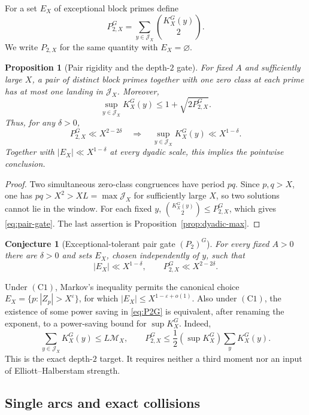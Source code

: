 \documentclass[11pt]{amsart}
\theoremstyle{plain}
\newtheorem{proposition}{Proposition}
\newtheorem{conjecture}{Conjecture}
\theoremstyle{remark}
\begin{document}
For a set $E_X$ of exceptional block primes define
\[
 P_{2,X}^{G}
 =\sum_{y\in\mathcal J_X}\binom{K_X^{G}(y)}2.
 \tag{6.3}\label{eq:P2-definition}
\]
We write $P_{2,X}$ for the same quantity with $E_X=\varnothing$.

\begin{proposition}[Pair rigidity and the depth-$2$ gate]
\label{prop:pair-gate}
For fixed $A$ and sufficiently large $X$, a pair of distinct block
primes together with one zero class at each prime has at most one
landing in $\mathcal J_X$.  Moreover,
\[
 \sup_{y\in\mathcal J_X}K_X^{G}(y)
 \leq1+\sqrt{2P_{2,X}^{G}}.
 \tag{6.4}\label{eq:pair-gate}
\]
Thus, for any $\delta>0$,
\[
 P_{2,X}^{G}\ll X^{2-2\delta}
 \quad\Longrightarrow\quad
 \sup_{y\in\mathcal J_X}K_X^{G}(y)\ll X^{1-\delta}.
 \tag{6.5}\label{eq:P2-to-sup}
\]
Together with $|E_X|\ll X^{1-\delta}$ at every dyadic scale, this
implies the pointwise conclusion.
\end{proposition}

\begin{proof}
Two simultaneous zero-class congruences have period $pq$.  Since
$p,q>X$, one has $pq>X^2>XL=\max\mathcal J_X$ for sufficiently large
$X$, so two solutions cannot lie in the window.  For each fixed $y$,
$\binom{K_X^{G}(y)}2\leq P_{2,X}^{G}$, which gives
\eqref{eq:pair-gate}.  The last assertion is
Proposition~\ref{prop:dyadic-max}.
\end{proof}

\begin{conjecture}[Exceptional-tolerant pair gate $(P_2)^G$]
\label{conj:P2G}
For every fixed $A>0$ there are $\delta>0$ and sets $E_X$, chosen
independently of $y$, such that
\[
 |E_X|\ll X^{1-\delta},\qquad
 P_{2,X}^{G}\ll X^{2-2\delta}.
 \tag{$P_2^G$}\label{eq:P2G}
\]
\end{conjecture}

Under $(\mathrm C1)$, Markov's inequality permits the canonical choice
$E_X=\{p:|Z_p|>X^\varepsilon\}$, for which
$|E_X|\leq X^{1-\varepsilon+o(1)}$.  Also under $(\mathrm C1)$, the
existence of some power saving in \eqref{eq:P2G} is equivalent, after
renaming the exponent, to a power-saving bound for
$\sup K_X^G$.  Indeed,
\[
 \sum_{y\in\mathcal J_X}K_X^G(y)\leq L\mathcal M_X,
 \qquad
 P_{2,X}^{G}\leq\frac12(\sup K_X^G)
       \sum_yK_X^G(y).
\]
This is the exact depth-$2$ target.  It requires neither a third moment
nor an input of Elliott--Halberstam strength.

\subsection{Single arcs and exact collisions}
\end{document}
